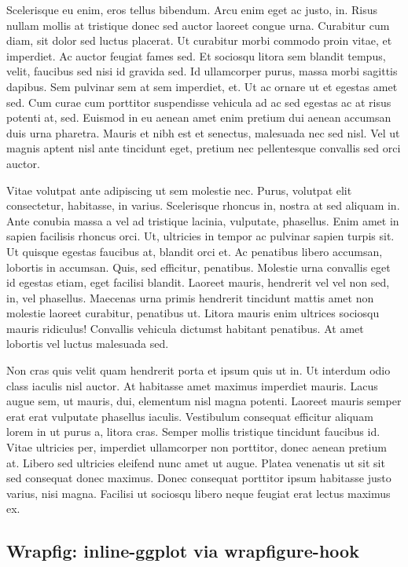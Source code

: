 \documentclass[
  9pt,
  letterpaper,
  DIV=11,
  numbers=noendperiod]{scrartcl}
\begin{document}
Scelerisque eu enim, eros tellus bibendum. Arcu enim eget ac justo, in.
Risus nullam mollis at tristique donec sed auctor laoreet congue urna.
Curabitur cum diam, sit dolor sed luctus placerat. Ut curabitur morbi
commodo proin vitae, et imperdiet. Ac auctor feugiat fames sed. Et
sociosqu litora sem blandit tempus, velit, faucibus sed nisi id gravida
sed. Id ullamcorper purus, massa morbi sagittis dapibus. Sem pulvinar
sem at sem imperdiet, et. Ut ac ornare ut et egestas amet sed. Cum curae
cum porttitor suspendisse vehicula ad ac sed egestas ac at risus potenti
at, sed. Euismod in eu aenean amet enim pretium dui aenean accumsan duis
urna pharetra. Mauris et nibh est et senectus, malesuada nec sed nisl.
Vel ut magnis aptent nisl ante tincidunt eget, pretium nec pellentesque
convallis sed orci auctor.

Vitae volutpat ante adipiscing ut sem molestie nec. Purus, volutpat elit
consectetur, habitasse, in varius. Scelerisque rhoncus in, nostra at sed
aliquam in. Ante conubia massa a vel ad tristique lacinia, vulputate,
phasellus. Enim amet in sapien facilisis rhoncus orci. Ut, ultricies in
tempor ac pulvinar sapien turpis sit. Ut quisque egestas faucibus at,
blandit orci et. Ac penatibus libero accumsan, lobortis in accumsan.
Quis, sed efficitur, penatibus. Molestie urna convallis eget id egestas
etiam, eget facilisi blandit. Laoreet mauris, hendrerit vel vel non sed,
in, vel phasellus. Maecenas urna primis hendrerit tincidunt mattis amet
non molestie laoreet curabitur, penatibus ut. Litora mauris enim
ultrices sociosqu mauris ridiculus! Convallis vehicula dictumst habitant
penatibus. At amet lobortis vel luctus malesuada sed.

Non cras quis velit quam hendrerit porta et ipsum quis ut in. Ut
interdum odio class iaculis nisl auctor. At habitasse amet maximus
imperdiet mauris. Lacus augue sem, ut mauris, dui, elementum nisl magna
potenti. Laoreet mauris semper erat erat vulputate phasellus iaculis.
Vestibulum consequat efficitur aliquam lorem in ut purus a, litora cras.
Semper mollis tristique tincidunt faucibus id. Vitae ultricies per,
imperdiet ullamcorper non porttitor, donec aenean pretium at. Libero sed
ultricies eleifend nunc amet ut augue. Platea venenatis ut sit sit sed
consequat donec maximus. Donec consequat porttitor ipsum habitasse justo
varius, nisi magna. Facilisi ut sociosqu libero neque feugiat erat
lectus maximus ex.

\newpage{}

\hypertarget{wrapfig-inline-ggplot-via-wrapfigure-hook}{%
\subsection{Wrapfig: inline-ggplot via
wrapfigure-hook}\label{wrapfig-inline-ggplot-via-wrapfigure-hook}}
\end{document}
